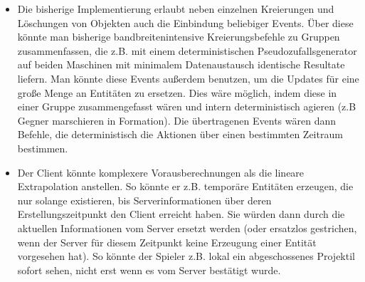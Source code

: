 \begin{itemize}
\item Die bisherige Implementierung erlaubt neben einzelnen Kreierungen und Löschungen von Objekten auch die Einbindung beliebiger Events. Über diese könnte man bisherige bandbreitenintensive Kreierungsbefehle zu Gruppen zusammenfassen, die z.B. mit einem deterministischen Pseudozufallsgenerator auf beiden Maschinen mit minimalem Datenaustausch identische Resultate liefern. Man könnte diese Events außerdem benutzen, um die Updates für eine große Menge an Entitäten zu ersetzen. Dies wäre möglich, indem diese in einer Gruppe zusammengefasst wären und intern deterministisch agieren (z.B Gegner marschieren in Formation). Die übertragenen Events wären dann Befehle, die deterministisch die Aktionen über einen bestimmten Zeitraum bestimmen.
\item Der Client könnte komplexere Vorausberechnungen als die lineare Extrapolation anstellen. So könnte er z.B. temporäre Entitäten erzeugen, die nur solange existieren, bis Serverinformationen über deren Erstellungszeitpunkt den Client erreicht haben. Sie würden dann durch die aktuellen Informationen vom Server ersetzt werden (oder ersatzlos gestrichen, wenn der Server für diesem Zeitpunkt keine Erzeugung einer Entität vorgesehen hat). So könnte der Spieler z.B. lokal ein abgeschossenes Projektil sofort sehen, nicht erst wenn es vom Server bestätigt wurde.
\end{itemize}